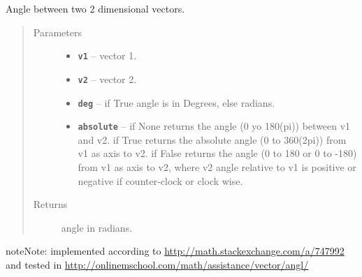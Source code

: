 \documentclass[letterpaper,10pt,english]{sphinxmanual}
\begin{document}

\begin{fulllineitems}
\label{RRtoolbox.lib.arrayops:RRtoolbox.lib.arrayops.basic.angle2D}
Angle between two 2 dimensional vectors.
\begin{quote}\begin{description}
\item[{Parameters}] \leavevmode\begin{itemize}
\item {} 
\textbf{\texttt{v1}} -- vector 1.

\item {} 
\textbf{\texttt{v2}} -- vector 2.

\item {} 
\textbf{\texttt{deg}} -- if True angle is in Degrees, else radians.

\item {} 
\textbf{\texttt{absolute}} -- if None returns the angle (0 yo 180(pi)) between v1 and v2.
if True returns the absolute angle (0 to 360(2pi)) from v1 as axis to v2.
if False returns the angle (0 to 180 or 0 to -180) from v1 as axis to v2,
where v2 angle relative to v1 is positive or negative if counter-clock or clock wise.

\end{itemize}

\item[{Returns}] \leavevmode
angle in radians.

\end{description}\end{quote}

\begin{notice}{note}{Note:}
implemented according to \href{http://math.stackexchange.com/a/747992}{http://math.stackexchange.com/a/747992}
and tested in \href{http://onlinemschool.com/math/assistance/vector/angl/}{http://onlinemschool.com/math/assistance/vector/angl/}
\end{notice}

\end{fulllineitems}

\end{document}
